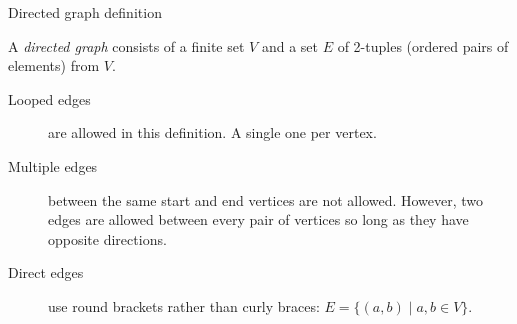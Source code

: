 \documentclass[dvipsnames, hidelinks]{beamer}
\begin{document}
  
  
  
  
  \begin{frame}{Directed graph definition}
    \begin{definition}
    A \emph{directed graph} consists of a finite set $V$ and a set $E$ of 2-tuples (ordered pairs of elements) from $V$.
    \end{definition}
    \vspace{0.2cm}
    \begin{description}
      \item[Looped edges] are allowed in this definition. A single one per vertex.
      \item[Multiple edges] between the same start and end vertices are not allowed. However, two edges are allowed between every pair of vertices so long as they have opposite directions.
      \item[Direct edges] use round brackets rather than curly braces: $E = \{ (a,b) \mid a,b \in V\}$.
    \end{description}
  \end{frame}
  
\end{document}
